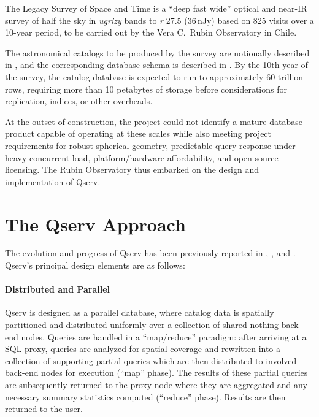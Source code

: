 \documentclass[11pt,twoside]{article}
\begin{document}
The Legacy Survey of Space and Time \citep{2019ApJ...873..111I} is a ``deep fast wide'' optical and near-IR
survey of half the sky in \emph{ugrizy} bands to \emph{r} 27.5 (36\,nJy) based on 825 visits over a 10-year
period, to be carried out by the Vera C.\ Rubin Observatory in Chile.

The astronomical catalogs to be produced by the survey are notionally described in \citet{LSE-163}, and the
corresponding database schema is described in \citet{LDM-153}.  By the 10th year of the survey, the catalog
database is expected to run to approximately 60 trillion rows, requiring more than 10 petabytes of storage
before considerations for replication, indices, or other overheads.

At the outset of construction, the project could not identify a mature database product capable of operating
at these scales while also meeting project requirements for robust spherical geometry, predictable query
response under heavy concurrent load, platform/hardware affordability, and open source licensing.  The Rubin
Observatory thus embarked on the design and implementation of Qserv.

\section{The Qserv Approach}

The evolution and progress of Qserv has been previously reported in \citet{2006SPIE.6270E..0RB},
\citet{2011Wang:2011:QDS:2063348.2063364}, and \citet{LDM-135}.  Qserv's principal design elements are as
follows:

\paragraph {Distributed and Parallel}

Qserv is designed as a parallel database, where catalog data is spatially partitioned and distributed
uniformly over a collection of shared-nothing back-end nodes.  Queries are handled in a ``map/reduce''
paradigm: after arriving at a SQL proxy, queries are analyzed for spatial coverage and rewritten into a
collection of supporting partial queries which are then distributed to involved back-end nodes for execution
(``map'' phase). The results of these partial queries are subsequently returned to the proxy node where they
are aggregated and any necessary summary statistics computed (``reduce'' phase). Results are then returned to
the user.
\end{document}
